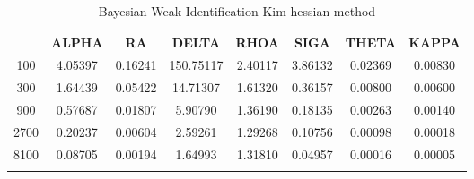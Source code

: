 \documentclass[a4paper,10pt]{article}
\begin{document}
\centering
\begin{longtable}{cccccccc}
\toprule
 & ALPHA & RA & DELTA & RHOA & SIGA & THETA & KAPPA \\
\midrule
100 & 4.05397 & 0.16241 & 150.75117 & 2.40117 & 3.86132 & 0.02369 & 0.00830 \\
300 & 1.64439 & 0.05422 & 14.71307 & 1.61320 & 0.36157 & 0.00800 & 0.00600 \\
900 & 0.57687 & 0.01807 & 5.90790 & 1.36190 & 0.18135 & 0.00263 & 0.00140 \\
2700 & 0.20237 & 0.00604 & 2.59261 & 1.29268 & 0.10756 & 0.00098 & 0.00018 \\
8100 & 0.08705 & 0.00194 & 1.64993 & 1.31810 & 0.04957 & 0.00016 & 0.00005 \\
\bottomrule
\caption{Bayesian Weak Identification Kim hessian method}
\label{table:tbl:WeakKim_hessian}
\end{longtable}
\end{document}
